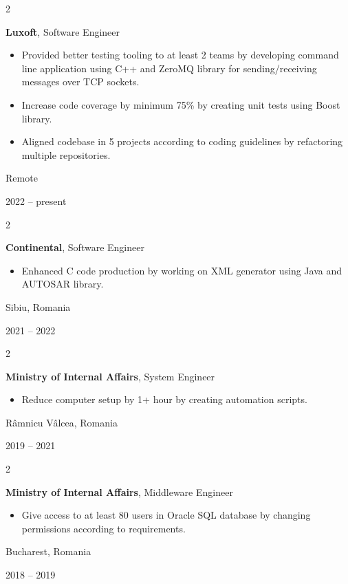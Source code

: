 \documentclass[10pt, letterpaper]{article}
\newenvironment{highlights}{
    \begin{itemize}[
        topsep=0.10 cm,
        parsep=0.10 cm,
        partopsep=0pt,
        itemsep=0pt,
        leftmargin=0.4 cm + 10pt
    ]
}{
    \end{itemize}
} %
\newenvironment{twocolentry}[2][]{
    \onecolentry
    \def\secondColumn{#2}
    \setcolumnwidth{\fill, 4.5 cm}
    \begin{paracol}{2}
}{
    \switchcolumn \raggedleft \secondColumn
    \end{paracol}
    \endonecolentry
} %
\begin{document}
        
        \begin{twocolentry}{
            Remote

        2022 – present
        }
            \textbf{Luxoft}, Software Engineer
            \begin{highlights}
                \item Provided better testing tooling to at least 2 teams by developing command line application using C++ and ZeroMQ library for sending/receiving messages over TCP sockets.
                \item Increase code coverage by minimum 75\% by creating unit tests using Boost library.
                \item Aligned codebase in 5 projects according to coding guidelines by refactoring multiple repositories.
            \end{highlights}
        \end{twocolentry}


        \vspace{0.2 cm}

        \begin{twocolentry}{
            Sibiu, Romania

        2021 – 2022
        }
            \textbf{Continental}, Software Engineer
            \begin{highlights}
                \item Enhanced C code production by working on XML generator using Java and AUTOSAR library.
            \end{highlights}
        \end{twocolentry}


        \vspace{0.2 cm}

        \begin{twocolentry}{
            Râmnicu Vâlcea, Romania

        2019 – 2021
        }
            \textbf{Ministry of Internal Affairs}, System Engineer
            \begin{highlights}
                \item Reduce computer setup by 1+ hour by creating automation scripts.
            \end{highlights}
        \end{twocolentry}


        \vspace{0.2 cm}

        \begin{twocolentry}{
            Bucharest, Romania

        2018 – 2019
        }
            \textbf{Ministry of Internal Affairs}, Middleware Engineer
            \begin{highlights}
                \item Give access to at least 80 users in Oracle SQL database by changing permissions according to requirements.
            \end{highlights}
        \end{twocolentry}
\end{document}
